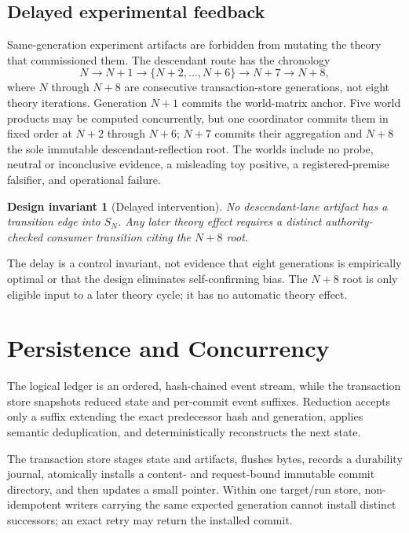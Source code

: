 \documentclass[11pt]{article}
\newtheorem{invariant}{Design invariant}
\begin{document}
\subsection{Delayed experimental feedback}

Same-generation experiment artifacts are forbidden from mutating the theory that commissioned them. The descendant route has the chronology
\[
N \rightarrow N+1 \rightarrow
\{N+2,\ldots,N+6\}\rightarrow N+7\rightarrow N+8,
\]
where $N$ through $N+8$ are consecutive transaction-store generations, not eight theory iterations. Generation $N+1$ commits the world-matrix anchor. Five world products may be computed concurrently, but one coordinator commits them in fixed order at $N+2$ through $N+6$; $N+7$ commits their aggregation and $N+8$ the sole immutable descendant-reflection root. The worlds include no probe, neutral or inconclusive evidence, a misleading toy positive, a registered-premise falsifier, and operational failure.

\begin{invariant}[Delayed intervention]
No descendant-lane artifact has a transition edge into $S_N$. Any later theory effect requires a distinct authority-checked consumer transition citing the $N+8$ root.
\end{invariant}

The delay is a control invariant, not evidence that eight generations is empirically optimal or that the design eliminates self-confirming bias. The $N+8$ root is only eligible input to a later theory cycle; it has no automatic theory effect.

\section{Persistence and Concurrency}

The logical ledger is an ordered, hash-chained event stream, while the transaction store snapshots reduced state and per-commit event suffixes. Reduction accepts only a suffix extending the exact predecessor hash and generation, applies semantic deduplication, and deterministically reconstructs the next state.

The transaction store stages state and artifacts, flushes bytes, records a durability journal, atomically installs a content- and request-bound immutable commit directory, and then updates a small pointer. Within one target/run store, non-idempotent writers carrying the same expected generation cannot install distinct successors; an exact retry may return the installed commit.
\end{document}

